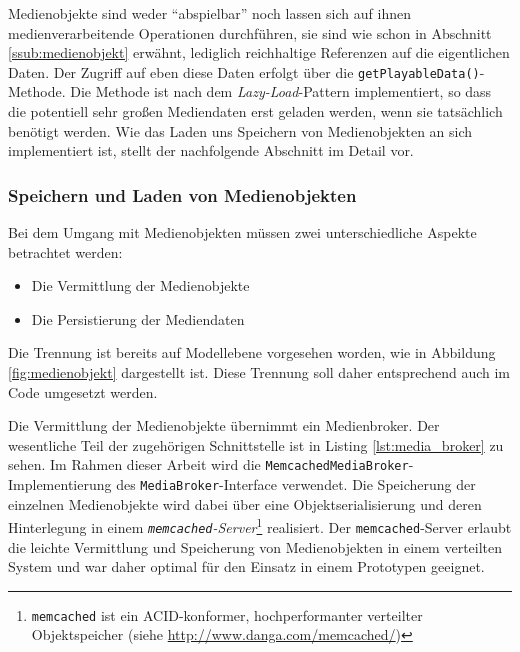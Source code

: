   
  
  Medienobjekte sind weder "`abspielbar"' noch lassen sich auf ihnen medienverarbeitende Operationen durchführen, sie sind wie schon in Abschnitt \ref{ssub:medienobjekt} erwähnt, lediglich reichhaltige Referenzen auf die eigentlichen Daten. Der Zugriff auf eben diese Daten erfolgt über die \verb!getPlayableData()!-Methode. Die Methode ist nach dem \emph{Lazy-Load}-Pattern \citep[S. 200]{fowler03peaa} implementiert, so dass die potentiell sehr großen Mediendaten erst geladen werden, wenn sie tatsächlich benötigt werden. Wie das Laden uns Speichern von Medienobjekten an sich implementiert ist, stellt der nachfolgende Abschnitt im Detail vor.
 
\subsubsection{Speichern und Laden von Medienobjekten} %
\label{ssub:speichern_und_laden_von_medienobjekten}

  Bei dem Umgang mit Medienobjekten müssen zwei unterschiedliche Aspekte betrachtet werden:
  
  \begin{itemize}
    \item Die Vermittlung der Medienobjekte
    \item Die Persistierung der Mediendaten
  \end{itemize}
  
  Die Trennung ist bereits auf Modellebene vorgesehen worden, wie in Abbildung \ref{fig:medienobjekt} dargestellt ist. Diese Trennung soll daher entsprechend auch im Code umgesetzt werden.
  
  Die Vermittlung der Medienobjekte übernimmt ein Medienbroker. Der wesentliche Teil der zugehörigen Schnittstelle ist in Listing \ref{lst:media_broker} zu sehen. Im Rahmen dieser Arbeit wird die \verb!MemcachedMediaBroker!-Implementierung des \verb!MediaBroker!-Interface verwendet. Die Speicherung der einzelnen Medienobjekte wird dabei über eine Objektserialisierung und deren Hinterlegung in einem \texttt{\slshape{memcached}}\emph{-Server}\footnote{\lstinline[basicstyle=\ttfamily\footnotesize]!memcached! ist ein ACID-konformer, hochperformanter verteilter Objektspeicher (siehe \url{http://www.danga.com/memcached/})} realisiert. Der \verb!memcached!-Server erlaubt die leichte Vermittlung und Speicherung von Medienobjekten in einem verteilten System und war daher optimal für den Einsatz in einem Prototypen geeignet.
  
